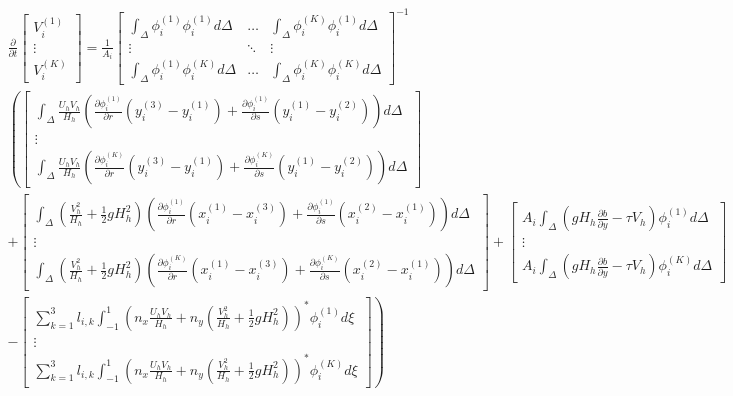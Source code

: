 \documentclass[11pt]{article}
\begin{document}
{\tiny
\begin{multline}
\frac{\partial}{\partial t} \begin{bmatrix} V_i^{(1)} \\[5pt] \vdots \\[5pt] V_i^{(K)}  \end{bmatrix} =\frac{1}{A_i}\begin{bmatrix}\displaystyle\int_{\Delta}\phi_i^{(1)}\phi_i^{(1)}d\Delta & \hdots & \displaystyle\int_{\Delta}\phi_i^{(K)}\phi_i^{(1)}d\Delta \\[5pt] \vdots & \ddots & \vdots \\[5pt]  \displaystyle\int_{\Delta}\phi_i^{(1)}\phi_i^{(K)}d\Delta & \hdots & \displaystyle\int_{\Delta}\phi_i^{(K)}\phi_i^{(K)}d\Delta\end{bmatrix}^{-1}  \\ \left( \begin{bmatrix}\displaystyle\int_{\Delta}\frac{U_hV_h}{H_h}\left(\frac{\partial \phi_i^{(1)}}{\partial r}\left(y_i^{(3)}-y_i^{(1)}\right) + \frac{\partial \phi_i^{(1)}}{\partial s}\left(y_i^{(1)}-y_i^{(2)}\right) \right)d\Delta     \\ \vdots \\ \displaystyle\int_{\Delta}\frac{U_hV_h}{H_h}\left(\frac{\partial \phi_i^{(K)}}{\partial r}\left(y_i^{(3)}-y_i^{(1)}\right) + \frac{\partial \phi_i^{(K)}}{\partial s}\left(y_i^{(1)}-y_i^{(2)}\right) \right) d\Delta \end{bmatrix} \right.\\ + \left. \begin{bmatrix}  \displaystyle\int_{\Delta}\left(\frac{V_h^2}{H_h} + \frac{1}{2}gH_h^2\right)\left(\frac{\partial \phi_i^{(1)}}{\partial r}\left(x_i^{(1)}-x_i^{(3)}\right) + \frac{\partial \phi_i^{(1)}}{\partial s}\left(x_i^{(2)}-x_i^{(1)}\right) \right)d\Delta \\ \vdots \\ \displaystyle\int_{\Delta}\left(\frac{V_h^2}{H_h} + \frac{1}{2}gH_h^2\right)\left(\frac{\partial \phi_i^{(K)}}{\partial r}\left(x_i^{(1)}-x_i^{(3)}\right) + \frac{\partial \phi_i^{(K)}}{\partial s}\left(x_i^{(2)}-x_i^{(1)}\right) \right) d\Delta \end{bmatrix} + \begin{bmatrix}A_i \displaystyle\int_{\Delta}\left( gH_h\frac{\partial b}{\partial y} - \tau V_h \right)\phi_i^{(1)} d\Delta  \\ \vdots \\  A_i\displaystyle\int_{\Delta}\left( gH_h\frac{\partial b}{\partial y} - \tau V_h \right)\phi_i^{(K)} d\Delta  \end{bmatrix} \right. \\ \left. -\begin{bmatrix}\displaystyle\sum_{k=1}^3 l_{i,k}\int_{-1}^1 \left(n_x\frac{U_hV_h}{H_h} + n_y\left(\frac{V_h^2}{H_h} + \frac{1}{2}gH_h^2\right)\right)^*\phi_i^{(1)} d\xi \\ \vdots \\ \displaystyle\sum_{k=1}^3 l_{i,k}\int_{-1}^1 \left(n_x\frac{U_hV_h}{H_h} + n_y\left(\frac{V_h^2}
{H_h} + \frac{1}{2}gH_h^2\right)\right)^*\phi_i^{(K)} d\xi \end{bmatrix} \right) 
\end{multline}}
\end{document}
